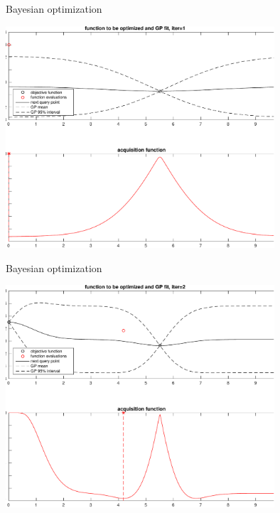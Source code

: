\documentclass[t]{beamer}
\begin{document}
\begin{frame}
  
  {\Large\color{navyblue} Bayesian optimization}

    \includegraphics[width=10cm]{bayesopt_1d_regular_iter1-crop.pdf}

\end{frame}

\begin{frame}
  
  {\Large\color{navyblue} Bayesian optimization}

    \includegraphics[width=10cm]{bayesopt_1d_regular_iter2-crop.pdf}

\end{frame}
\end{document}
